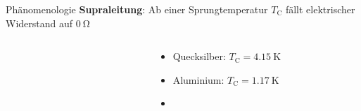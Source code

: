\begin{frame}{Phänomenologie}
\textbf{Supraleitung}: Ab einer Sprungtemperatur $T_{\mathup{C}}$ fällt elektrischer Widerstand auf $\SI{0}{\ohm}$ \\
\begin{columns}
\begin{column}{0.49\textwidth}
  \begin{figure}
    \label{fig: hg_supraleitung}
  \end{figure}
\end{column}
\begin{column}{0.49\textwidth}
\begin{itemize}
  \item Quecksilber: $T_{\mathup{C}} = \SI{4.15}{\kelvin}$
  \item Aluminium: $T_{\mathup{C}} = \SI{1.17}{\kelvin}$
  \item {}
\end{itemize}
\end{column}
\end{columns}




\end{frame}



